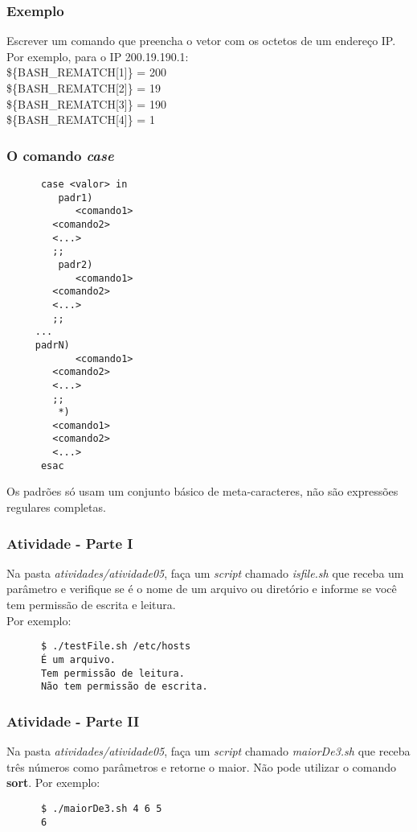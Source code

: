 \documentclass{beamer}
\begin{document}
   \begin{frame}
      \frametitle{Exemplo}
      Escrever um comando que preencha o vetor com os octetos de um endereço IP. \\
      Por exemplo, para o IP 200.19.190.1: \\
      \$\{BASH\_REMATCH[1]\} = 200 \\
      \$\{BASH\_REMATCH[2]\} = 19 \\
      \$\{BASH\_REMATCH[3]\} = 190 \\ 
      \$\{BASH\_REMATCH[4]\} = 1 \\
   \end{frame}
   
   \begin{frame}[fragile]
      \frametitle{O comando \textit{case}}
      \scriptsize
      \begin{verbatim}
      case <valor> in
         padr1)
            <comando1>
	    <comando2>
	    <...>
	    ;;
         padr2)
            <comando1>
	    <comando2>
	    <...>
	    ;;
	 ...
	 padrN)
            <comando1>
	    <comando2>
	    <...>
	    ;;
         *)
	    <comando1>
	    <comando2>
	    <...>
      esac 
      \end{verbatim}
      Os padrões só usam um conjunto básico de meta-caracteres, não são expressões regulares completas.
\end{frame}

   \begin{frame}[fragile]
      \frametitle{Atividade - Parte I}
      Na pasta \textit{atividades/atividade05}, faça um \textit{script} chamado \textit{isfile.sh} que receba um parâmetro e verifique se é o nome de um arquivo ou diretório e informe se você tem permissão de escrita e leitura. \\
      Por exemplo: 
      \begin{verbatim}
      $ ./testFile.sh /etc/hosts 
      É um arquivo. 
      Tem permissão de leitura. 
      Não tem permissão de escrita. 
      \end{verbatim}
\end{frame}

   \begin{frame}[fragile]
      \frametitle{Atividade - Parte II}
      Na pasta \textit{atividades/atividade05}, faça um \textit{script} chamado \textit{maiorDe3.sh} que receba três números como parâmetros e retorne o maior. Não pode utilizar o comando \textbf{sort}.
      Por exemplo: 
      \begin{verbatim}
      $ ./maiorDe3.sh 4 6 5 
      6
      \end{verbatim}
\end{frame}
\end{document}

